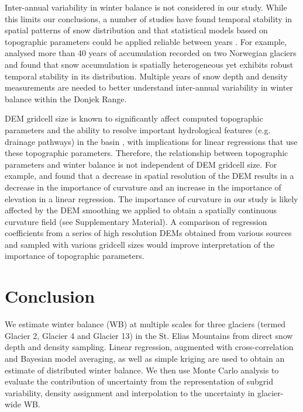 \documentclass[twocolumn, letterpaper]{igs}
\begin{document}
Inter-annual variability in winter balance is not considered in our study. While this limits our conclusions, a number of studies have found temporal stability in spatial patterns of snow distribution and that statistical models based on topographic parameters could be applied reliable between years \citep[e.g.][]{Grunewald2013}. For example, \cite{Walmsley2015} analysed more than 40 years of accumulation recorded on two Norwegian glaciers and found that snow accumulation is spatially heterogeneous yet exhibits robust temporal stability in its distribution. Multiple years of snow depth and density measurements are needed to better understand inter-annual variability in winter balance within the Donjek Range.

DEM gridcell size is known to significantly affect computed topographic parameters and the ability to resolve important hydrological features (e.g. drainage pathways) in the basin \citep{Zhang1994, Garbrecht1994, Guo-an2001, Lopez2010}, with implications for linear regressions that use these topographic parameters. Therefore, the relationship between topographic parameters and winter balance is not independent of DEM gridcell size. For example, \cite{Kienzle2004} and \cite{Lopez2010} found that a decrease in spatial resolution of the DEM results in a decrease in the importance of curvature and an increase in the importance of elevation in a linear regression. The importance of curvature in our study is likely affected by the DEM smoothing we applied to obtain a spatially continuous curvature field (see Supplementary Material). A comparison of regression coefficients from a series of high resolution DEMs obtained from various sources and sampled with various gridcell sizes would improve interpretation of the importance of topographic parameters. 



\section{Conclusion}

We estimate winter balance (WB) at multiple scales for three glaciers (termed Glacier 2, Glacier 4 and Glacier 13) in the St. Elias Mountains from direct snow depth and density sampling. Linear regression, augmented with cross-correlation and Bayesian model averaging, as well as simple kriging are used to obtain an estimate of distributed winter balance. We then use Monte Carlo analysis to  evaluate the contribution of uncertainty from the representation of subgrid variability, density assignment and interpolation to the uncertainty in glacier-wide WB. 
\end{document}

